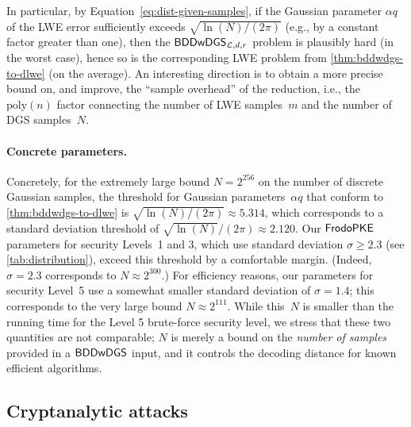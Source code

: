 \documentclass{iacrcc}
\begin{document}
In particular, by Equation~\eqref{eq:dist-given-samples}, if the
Gaussian parameter $\alpha q$ of the LWE error sufficiently exceeds
$\sqrt{\ln(N)/(2\pi)}$ (e.g., by a constant factor greater than one),
then the $\mathsf{BDDwDGS}_{\mathcal{L},d,r}$ problem is plausibly hard (in the
worst case), hence so is the corresponding LWE problem from
\autoref{thm:bddwdgs-to-dlwe} (on the average).  An interesting
direction is to obtain a more precise bound on, and improve, the
``sample overhead'' of the reduction, i.e., the $\text{poly}(n)$
factor connecting the number of LWE samples~$m$ and the number of DGS
samples~$N$.

\paragraph{Concrete parameters.}

Concretely, for the extremely large bound $N = 2^{256}$ on the
number of discrete Gaussian samples, the threshold for Gaussian
parameters~$\alpha q$ that conform to \autoref{thm:bddwdgs-to-dlwe} is
$\sqrt{\ln(N)/(2\pi)} \approx 5.314$, which corresponds to a standard
deviation threshold of $\sqrt{\ln(N)}/(2\pi) \approx 2.120$.  Our
$\textsf{\upshape\mdseries FrodoPKE}$ parameters for security Levels~1 and 3, which use standard
deviation $\sigma \geq 2.3$ (see \autoref{tab:distribution}), exceed
this threshold by a comfortable margin.  (Indeed, $\sigma = 2.3$
corresponds to $N \approx 2^{300}$.) For efficiency reasons, our
parameters for security Level~5 use a somewhat smaller standard
deviation of $\sigma = 1.4$; this corresponds to the very large bound
$N \approx 2^{111}$. While this~$N$ is smaller than the running time
for the Level 5 brute-force security level, we stress that these two
quantities are not comparable; $N$ is merely a bound on the
\emph{number of samples} provided in a $\mathsf{BDDwDGS}$ input, and it
controls the decoding distance for known efficient algorithms. 

\subsection{Cryptanalytic attacks}\label{sec:attack:cryptanalytic}


\end{document}

